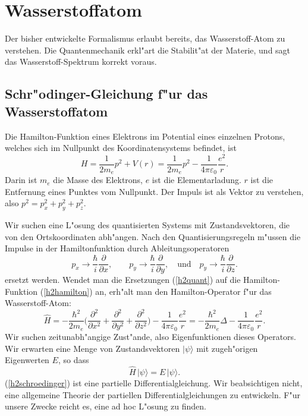 \chapter{Wasserstoffatom\label{chapter:wasserstoff}}
\rhead{}
Der bisher entwickelte Formalismus erlaubt bereits, das Wasserstoff-Atom
zu verstehen. Die Quantenmechanik erkl"art die Stabilit"at der
Materie, und sagt das Wasserstoff-Spektrum korrekt voraus.
\section{Schr"odinger-Gleichung f"ur das Wasserstoffatom}
Die Hamilton-Funktion eines Elektrons im Potential eines einzelnen
Protons, welches sich im Nullpunkt des Koordinatensystems befindet,
ist
\begin{equation}
H=\frac1{2m_e}p^2 + V(r)
=\frac1{2m_e}p^2 - \frac1{4\pi\varepsilon_0}\frac{e^2}{r}.
\label{h2hamilton}
\end{equation}
Darin ist $m_e$ die Masse des Elektrons, $e$ ist die Elementarladung.
$r$ ist die Entfernung eines Punktes vom Nullpunkt.
Der Impuls ist als Vektor zu verstehen, also $p^2=p_x^2+p_y^2+p_z^2$.

Wir suchen eine L"osung des quantisierten Systems mit Zustandsvektoren, die von
den Ortskoordinaten abh"angen.
Nach den Quantisierungsregeln m"ussen die Impulse in der Hamiltonfunktion
durch Ableitungsoperatoren
\begin{equation}
p_x\rightarrow \frac{\hbar}{i}\frac{\partial}{\partial x},
\qquad
p_y\rightarrow \frac{\hbar}{i}\frac{\partial}{\partial y},
\quad
\text{und}
\quad
p_y\rightarrow \frac{\hbar}{i}\frac{\partial}{\partial z}.
\label{h2quant}
\end{equation}
ersetzt werden. Wendet man die Ersetzungen (\ref{h2quant}) auf die
Hamilton-Funktion (\ref{h2hamilton}) an, erh"alt man den Hamilton-Operator
f"ur das Wasserstoff-Atom:
\[
\hat H=-\frac{\hbar^2}{2m_e}\biggl(
\frac{\partial^2}{\partial x^2}+
\frac{\partial^2}{\partial y^2}+
\frac{\partial^2}{\partial z^2}
\biggr)-\frac1{4\pi\varepsilon_0}\frac{e^2}{r}
=-\frac{\hbar^2}{2m_e}\Delta -\frac1{4\pi\varepsilon_0}\frac{e^2}{r}.
\]
Wir suchen zeitunabh"angige Zust"ande, also Eigenfunktionen dieses
Operators. Wir erwarten eine Menge von Zustandsvektoren $|\psi\rangle$
mit zugeh"origen Eigenwerten $E$, so dass
\begin{equation}
\hat H\,|\psi\rangle = E\,|\psi\rangle.
\label{h2schroedinger}
\end{equation}
(\ref{h2schroedinger}) ist eine partielle Differentialgleichung.
Wir beabsichtigen nicht, eine allgemeine Theorie der partiellen
Differentialgleichungen zu entwickeln.
F"ur unsere Zwecke reicht es, eine ad hoc L"osung zu finden.

